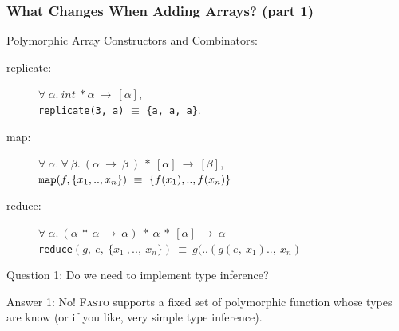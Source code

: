 \documentclass{beamer}
\renewcommand{\emph}[1]{\textcolor{structure}{#1}}
\newcommand{\emp}[1]{\textcolor{DikuRed}{ #1}}
\begin{document}
\begin{frame}[fragile,t]
   \frametitle{What Changes When Adding Arrays? (part 1)}

\bigskip

Polymorphic Array Constructors and Combinators:

\smallskip

\begin{description}
    \item[replicate:] $\forall~\alpha.~int~*\alpha~\rightarrow~[\alpha]$,\\
                        {\tt replicate(3, a)} $\equiv$ {\tt\{a, a, a\}}.\smallskip
    
    \item[map:] $\forall~\alpha.~\forall~\beta.~(\alpha~\rightarrow~\beta~)~*~[\alpha]~\rightarrow~[\beta]$,\\
                    ${\tt map}(f, \{x_1 ,..,x_n\})~\equiv~\{f(x_1 ),..,f(x_n)\}$\smallskip


    \item[reduce:] $\forall~\alpha.~(\alpha~*~\alpha~\rightarrow~\alpha)~*~\alpha~*~[\alpha]~\rightarrow~\alpha$\\
                        {\tt reduce}$(g,~e,~\{x_1~,..,~x_n\})~\equiv~g(..(g(e,~x_1 )..,~x_n)$

\end{description}

\bigskip

\emp{Question 1: Do we need to implement type inference?}

\bigskip

\emph{Answer 1: No! \textsc{Fasto} supports a fixed set of polymorphic function
whose types are know (or if you like, very simple type inference).} 
\end{frame}
\end{document}
